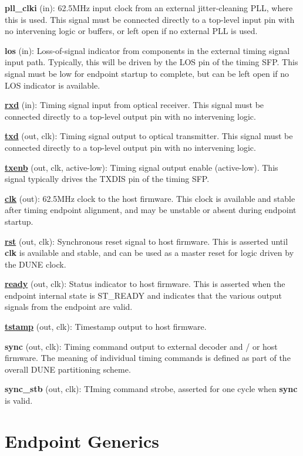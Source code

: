 \documentclass{article}
\begin{document}
\textbf{pll\_clki} (in): 62.5MHz input clock from an external jitter-cleaning PLL, where this is used. This signal must be connected directly to a top-level input pin with no intervening logic or buffers, or left open if no external PLL is used.

\textbf{los} (in): Loss-of-signal indicator from components in the external timing signal input path. Typically, this will be driven by the LOS pin of the timing SFP. This signal must be low for endpoint startup to complete, but can be left open if no LOS indicator is available.

\textbf{\uline{rxd}} (in): Timing signal input from optical receiver. This signal must be connected directly to a top-level output pin with no intervening logic.

\textbf{\uline{txd}} (out, clk): Timing signal output to optical transmitter. This signal must be connected directly to a top-level output pin with no intervening logic.

\textbf{\uline{txenb}} (out, clk, active-low): Timing signal output enable (active-low). This signal typically drives the TXDIS pin of the timing SFP.

\textbf{\uline{clk}} (out): 62.5MHz clock to the host firmware. This clock is available and stable after timing endpoint alignment, and may be unstable or absent during endpoint startup.

\textbf{\uline{rst}} (out, clk): Synchronous reset signal to host firmware. This is asserted until \textbf{clk} is available and stable, and can be used as a master reset for logic driven by the DUNE clock.

\textbf{\uline{ready}} (out, clk): Status indicator to host firmware. This is asserted when the endpoint internal state is ST\_READY and indicates that the various output signals from the endpoint are valid.

\textbf{\uline{tstamp}} (out, clk): Timestamp output to host firmware.

\textbf{sync} (out, clk): Timing command output to external decoder and / or host firmware. The meaning of individual timing commands is defined as part of the overall DUNE partitioning scheme.

\textbf{sync\_stb} (out, clk): TIming command strobe, asserted for one cycle when \textbf{sync} is valid.

\section{Endpoint Generics}
\end{document}
